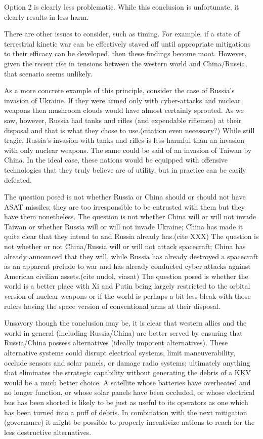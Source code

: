 Option 2 is clearly less problematic.  While this conclusion is
unfortunate, it clearly results in less harm.

There are other issues to consider, such as timing.  For example, if a
state of terrestrial kinetic war can be effectively staved off until
appropriate mitigations to their efficacy can be developed, then these
findings become moot.  However, given the recent rise in tensions
between the western world and China/Russia, that scenario seems
unlikely.

As a more concrete example of this principle, consider the case of
Russia's invasion of Ukraine.  If they were armed only with
cyber-attacks and nuclear weapons then mushroom clouds would have
almost certainly sprouted.  As we saw, however, Russia had tanks and
rifles (and expendable riflemen) at their disposal and that is what
they chose to use.(citation even necessary?)  While still tragic,
Russia's invasion with tanks and rifles is less harmful than an
invasion with only nuclear weapons.  The same could be said of an
invasion of Taiwan by China.  In the ideal case, these nations would
be equipped with offensive technologies that they truly believe are of
utility, but in practice can be easily defeated.

The question posed is not whether Russia or China should or should not
have ASAT missiles; they are too irresponsible to be entrusted with
them but they have them nonetheless.  The question is not whether
China will or will not invade Taiwan or whether Russia will or will
not invade Ukraine; China has made it quite clear that they intend to
and Russia already has.(cite XXX) The question is not whether or not
China/Russia will or will not attack spacecraft; China has already
announced that they will, while Russia has already destroyed a
spacecraft as an apparent prelude to war and has already conducted
cyber attacks against American civilian assets.(cite nudol, viasat)
The question posed is whether the world is a better place with Xi and
Putin being largely restricted to the orbital version of nuclear
weapons or if the world is perhaps a bit less bleak with those rulers
having the space version of conventional arms at their disposal.

Unsavory though the conclusion may be, it is clear that western allies
and the world in general (including Russia/China) are better served by
ensuring that Russia/China possess alternatives (ideally impotent
alternatives).  These alternative systems could disrupt electrical
systems, limit maneuverability, occlude sensors and solar panels, or
damage radio systems; ultimately anything that eliminates the
strategic capability without generating the debris of a KKV would be a
much better choice.  A satellite whose batteries have overheated and
no longer function, or whose solar panels have been occluded, or whose
electrical bus has been shorted is likely to be just as useful to its
operators as one which has been turned into a puff of debris.  In
combination with the next mitigation (governance) it might be possible
to properly incentivize nations to reach for the less destructive
alternatives.

